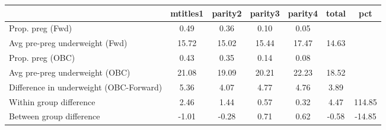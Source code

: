 \begin{tabular}{l*{6}{c}}
\toprule
            &\multicolumn{1}{c}{mtitles1}&\multicolumn{1}{c}{parity2}&\multicolumn{1}{c}{parity3}&\multicolumn{1}{c}{parity4}&\multicolumn{1}{c}{total}&\multicolumn{1}{c}{pct}\\
\midrule
\midrule
Prop. preg (Fwd)&        0.49&        0.36&        0.10&        0.05&            &            \\
Avg pre-preg underweight (Fwd)&       15.72&       15.02&       15.44&       17.47&       14.63&            \\
Prop. preg (OBC)&        0.43&        0.35&        0.14&        0.08&            &            \\
Avg pre-preg underweight (OBC)&       21.08&       19.09&       20.21&       22.23&       18.52&            \\
Difference in underweight (OBC-Forward)&        5.36&        4.07&        4.77&        4.76&        3.89&            \\
Within group difference&        2.46&        1.44&        0.57&        0.32&        4.47&      114.85\\
Between group difference&       -1.01&       -0.28&        0.71&        0.62&       -0.58&      -14.85\\
\bottomrule
\end{tabular}
